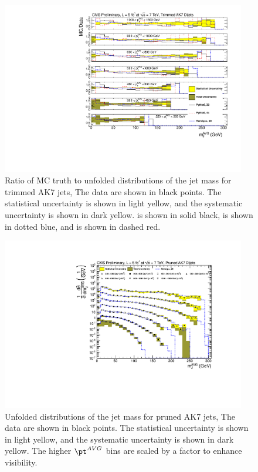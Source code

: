 \begin{figure}[htbp]
\centering
\includegraphics[width=0.95\textwidth]{figs/unfoldedMeasurementDijets_allfrac__Trimmed}
\caption{Ratio of MC truth to unfolded distributions of the jet mass for trimmed AK7 jets,
The data are shown in black points.
The statistical uncertainty is shown in light yellow, and the
systematic uncertainty is shown in dark yellow. \PYTHIA is shown in solid black, \HERWIG is shown in dotted blue, and  is shown in dashed red.
\label{figs:unfoldedMeasurementDijets_allfrac_Trimmed}}
\end{figure}

\begin{figure}[htbp]
\centering
\includegraphics[width=0.95\textwidth]{figs/unfoldedMeasurementDijets_all__Pruned}
\caption{Unfolded distributions of the jet mass for pruned AK7 jets,
The data are shown in black points. 
The statistical uncertainty is shown in light yellow, and the
systematic uncertainty is shown in dark yellow.
The higher $\pt^{AVG}$ bins are scaled by a factor to
enhance visibility.
\label{figs:unfoldedMeasurementDijets_all_Pruned}}
\end{figure}

